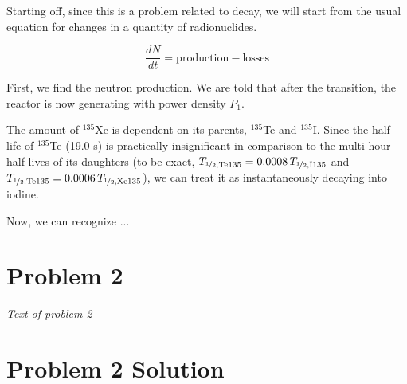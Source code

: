 \documentclass{report}
\begin{document}
Starting off, since this is a problem related to decay, we will start from the usual equation for changes in a quantity of radionuclides.

$$ \frac{dN}{dt} = \text{production} - \text{losses} $$

First, we find the neutron production. We are told that after the transition, the reactor is now generating with power density $P_1$. 

The amount of $^{135}$Xe is dependent on its parents, $^{135}$Te and $^{135}$I. Since the half-life of $^{135}$Te (19.0 s) is practically insignificant in comparison to the multi-hour half-lives of its daughters (to be exact, $T_{\nicefrac{1}{2},\text{Te135}} = 0.0008\,T_{\nicefrac{1}{2},\text{I135}}$ and $T_{\nicefrac{1}{2},\text{Te135}} = 0.0006\,T_{\nicefrac{1}{2},\text{Xe135}}$), we can treat it as instantaneously decaying into iodine.

Now, we can recognize ...



\newpage
\section*{Problem 2}

\textit{Text of problem 2}



\section*{Problem 2 Solution}
\end{document}
